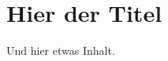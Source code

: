 \documentclass[a4paper,12pt]{scrartcl}
\begin{document}
\raggedbottom

\section*{Hier der Titel}

Und hier etwas Inhalt.
\end{document}
